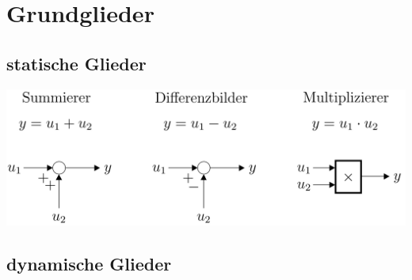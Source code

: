 \section{Grundglieder }
	\subsection{statische Glieder }
		\includegraphics[width=10 cm]{./bilder/grundglieder/statischeGlieder.png} \\
	
	\subsection{dynamische Glieder }






